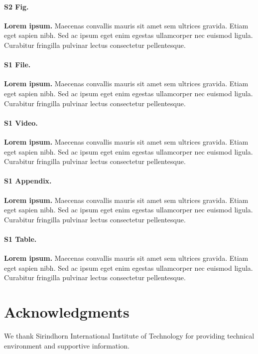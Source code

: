 \documentclass[10pt,letterpaper]{article}
\begin{document}
\paragraph*{S2 Fig.}
\label{S2_Fig}
{\bf Lorem ipsum.} Maecenas convallis mauris sit amet sem ultrices gravida. Etiam eget sapien nibh. Sed ac ipsum eget enim egestas ullamcorper nec euismod ligula. Curabitur fringilla pulvinar lectus consectetur pellentesque.

\paragraph*{S1 File.}
\label{S1_File}
{\bf Lorem ipsum.}  Maecenas convallis mauris sit amet sem ultrices gravida. Etiam eget sapien nibh. Sed ac ipsum eget enim egestas ullamcorper nec euismod ligula. Curabitur fringilla pulvinar lectus consectetur pellentesque.

\paragraph*{S1 Video.}
\label{S1_Video}
{\bf Lorem ipsum.}  Maecenas convallis mauris sit amet sem ultrices gravida. Etiam eget sapien nibh. Sed ac ipsum eget enim egestas ullamcorper nec euismod ligula. Curabitur fringilla pulvinar lectus consectetur pellentesque.

\paragraph*{S1 Appendix.}
\label{S1_Appendix}
{\bf Lorem ipsum.} Maecenas convallis mauris sit amet sem ultrices gravida. Etiam eget sapien nibh. Sed ac ipsum eget enim egestas ullamcorper nec euismod ligula. Curabitur fringilla pulvinar lectus consectetur pellentesque.

\paragraph*{S1 Table.}
\label{S1_Table}
{\bf Lorem ipsum.} Maecenas convallis mauris sit amet sem ultrices gravida. Etiam eget sapien nibh. Sed ac ipsum eget enim egestas ullamcorper nec euismod ligula. Curabitur fringilla pulvinar lectus consectetur pellentesque.

\section*{Acknowledgments}
	We thank Sirindhorn International Institute of Technology for providing technical environment and supportive information.
\end{document}
